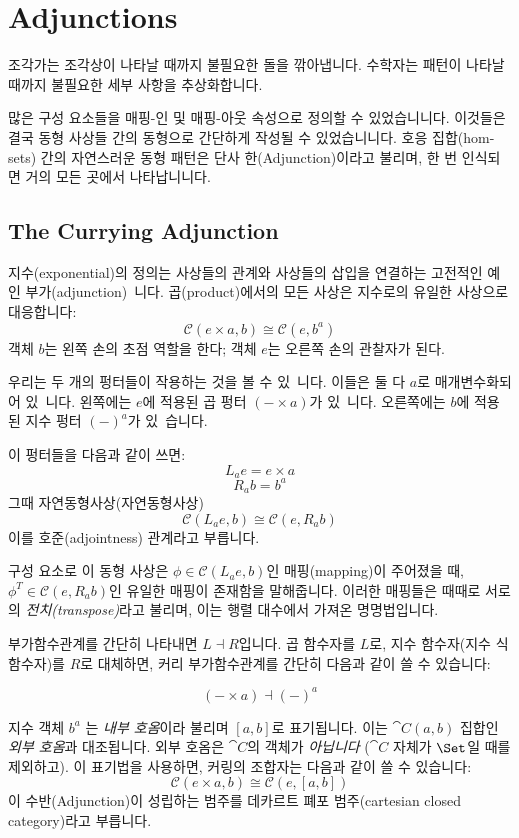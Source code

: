 \documentclass[DaoFP]{subfiles}
\begin{document}
\setcounter{chapter}{9}

\chapter{Adjunctions}

조각가는 조각상이 나타날 때까지 불필요한 돌을 깎아냅니다. 수학자는 패턴이 나타날 때까지 불필요한 세부 사항을 추상화합니다.

많은 구성 요소들을 매핑-인 및 매핑-아웃 속성으로 정의할 수 있었습니니다. 이것들은 결국 동형 사상들 간의 동형으로 간단하게 작성될 수 있었습니니다. 호응 집합(hom-sets) 간의 자연스러운 동형 패턴은 단사 한(Adjunction)이라고 불리며, 한 번 인식되면 거의 모든 곳에서 나타납니니다.

\section{The Currying Adjunction}

지수(exponential)의 정의는 사상들의 관계와 사상들의 삽입을 연결하는 고전적인 예인 부가(adjunction)~니다. 곱(product)에서의 모든 사상은 지수로의 유일한 사상으로 대응합니다:
\[  \mathcal{C}(e \times a, b ) \cong  \mathcal{C} (e, b^a)  \]
객체 $b$는 왼쪽 손의 초점 역할을 한다; 객체 $e$는 오른쪽 손의 관찰자가 된다.

우리는 두 개의 펑터들이 작용하는 것을 볼 수 있~니다. 이들은 둘 다 $a$로 매개변수화되어 있~니다. 왼쪽에는 $e$에 적용된 곱 펑터 $(- \times a)$가 있~니다. 오른쪽에는 $b$에 적용된 지수 펑터 $(-)^a$가 있~습니다.

이 펑터들을 다음과 같이 쓰면:
\[ L_a e = e \times a \]
\[ R_a b = b^a \]
그때 자연동형사상(자연동형사상)
\[ \mathcal{C}(L_a e, b) \cong \mathcal{C}(e, R_a b) \]
이를 호준(adjointness) 관계라고 부릅니다.

구성 요소로 이 동형 사상은 $\phi \in \mathcal{C}(L_a e, b)$인 매핑(mapping)이 주어졌을 때, $\phi^T \in \mathcal{C}(e, R_a b)$인 유일한 매핑이 존재함을 말해줍니다. 이러한 매핑들은 때때로 서로의 \emph{전치(transpose)}라고 불리며, 이는 행렬 대수에서 가져온 명명법입니다.

부가함수관계를 간단히 나타내면 $L \dashv R$입니다. 곱 함수자를 $L$로, 지수 함수자(지수 식 함수자)를 $R$로 대체하면, 커리 부가함수관계를 간단히 다음과 같이 쓸 수 있습니다:

\[ (- \times a) \dashv (-)^a \]

지수 객체 $b^a$ 는 \emph{내부 호옴}이라 불리며 $[a, b]$로 표기됩니다. 이는 $\cat C (a, b)$ 집합인 \emph{외부 호옴}과 대조됩니다. 외부 호옴은 $\cat C$의 객체가 \emph{아닙니다} ($\cat C$ 자체가 $\Set$일 때를 제외하고). 이 표기법을 사용하면, 커링의 조합자는 다음과 같이 쓸 수 있습니다:
\[  \mathcal{C}(e \times a, b) \cong  \mathcal{C} (e, [a, b])  \]
이 수반(Adjunction)이 성립하는 범주를 데카르트 폐포 범주(cartesian closed category)라고 부릅니다.
\end{document}
